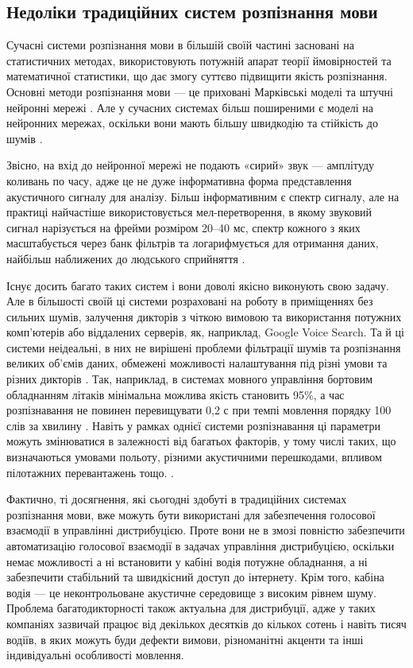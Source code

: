 \subsection{Недоліки традиційних систем розпізнання мови}
Сучасні системи розпізнання мови в більшій своїй частині засновані на статистичних методах, використовують потужній апарат теорії ймовірностей та математичної статистики, що дає змогу суттєво підвищити якість розпізнання. Основні методи розпізнання мови --- це приховані Марківські моделі та штучні нейронні мережі \cite{Makovkin_2006, Gefke_2012}. Але у сучасних системах більш поширеними є моделі на нейронних мережах, оскільки вони мають більшу швидкодію та стійкість до шумів \cite{Hinton_2012}.

Звісно, на вхід до нейронної мережі не подають «сирий» звук — амплітуду коливань по часу, адже це не дуже інформативна форма представлення акустичного сигналу для аналізу. Більш інформативним є спектр сигналу, але на практиці найчастіше використовується мел-перетворення, в якому звуковий сигнал нарізується на фрейми розміром 20–40 мс, спектр кожного з яких масштабується через банк фільтрів та логарифмується для отримання даних, найбільш наближених до людського сприйняття \cite{Saini_2013}.

Існує досить багато таких систем і вони доволі якісно виконують свою задачу. Але в більшості своїй ці системи розраховані на роботу в приміщеннях без сильних шумів, залучення дикторів з чіткою вимовою та використання потужних комп’ютерів або віддалених серверів, як, наприклад, Google Voice Search. Та й ці системи неідеальні, в них не вирішені проблеми фільтрації шумів та розпізнання великих об’ємів даних, обмежені можливості налаштування під різні умови та різних дикторів \cite{Volkov_2014}. Так, наприклад, в системах мовного управління бортовим обладнанням літаків мінімальна можлива якість становить 95\%, а час розпізнавання не повинен перевищувати 0,2 с при темпі мовлення порядку 100 слів за хвилину \cite{Bondaros_2007}. Навіть у рамках однієї системи розпізнавання ці параметри можуть змінюватися в залежності від багатьох факторів, у тому числі таких, що визначаються умовами польоту, різними акустичними перешкодами, впливом пілотажних перевантажень тощо. \cite{Korsun_2013}.

Фактично, ті досягнення, які сьогодні здобуті в традиційних системах розпізнання мови, вже можуть бути використані для забезпечення голосової взаємодії в управлінні дистрибуцією. Проте вони не в змозі повністю забезпечити автоматизацію голосової взаємодії в задачах управління дистрибуцією, оскільки немає можливості а ні встановити у кабіні водія потужне обладнання, а ні забезпечити стабільний та швидкісний доступ до інтернету. Крім того, кабіна водія — це неконтрольоване акустичне середовище з високим рівнем шуму. Проблема багатодикторності також актуальна для дистрибуції, адже у таких компаніях зазвичай працює від декількох десятків до кількох сотень і навіть тисяч водіїв, в яких можуть буди дефекти вимови, різноманітні акценти та інші індивідуальні особливості мовлення.

